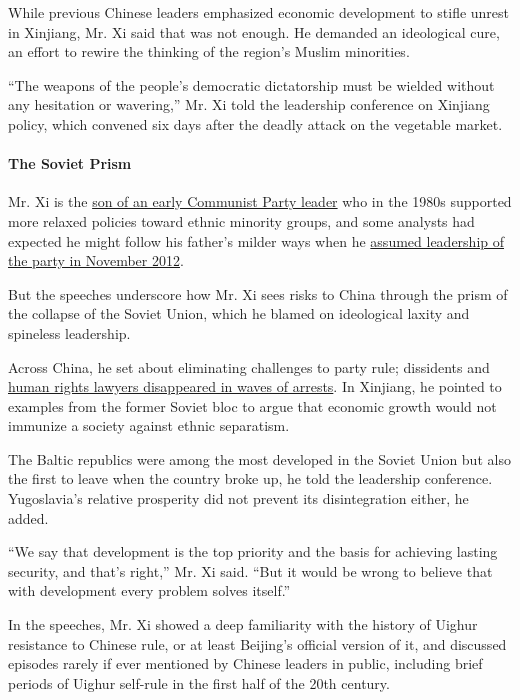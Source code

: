 While previous Chinese leaders emphasized economic development to stifle
unrest in Xinjiang, Mr. Xi said that was not enough. He demanded an
ideological cure, an effort to rewire the thinking of the region's
Muslim minorities.

``The weapons of the people's democratic dictatorship must be wielded
without any hesitation or wavering,'' Mr. Xi told the leadership
conference on Xinjiang policy, which convened six days after the deadly
attack on the vegetable market.

\hypertarget{-the-soviet-prism-}{%
\paragraph{ The Soviet Prism }\label{-the-soviet-prism-}}

Mr. Xi is the
\href{https://sinosphere.blogs.nytimes.com/2013/10/15/china-venerates-a-revolutionary-the-father-of-its-new-leader/}{son
of an early Communist Party leader} who in the 1980s supported more
relaxed policies toward ethnic minority groups, and some analysts had
expected he might follow his father's milder ways when he
\href{https://www.nytimes.com/2012/11/15/world/asia/communists-conclude-party-congress-in-china.html}{assumed
leadership of the party in November 2012}.

But the speeches underscore how Mr. Xi sees risks to China through the
prism of the collapse of the Soviet Union, which he blamed on
ideological laxity and spineless leadership.

Across China, he set about eliminating challenges to party rule;
dissidents and
\href{https://www.nytimes.com/2019/01/28/world/asia/china-wang-quanzhang-human-rights.html}{human
rights lawyers disappeared in waves of arrests}. In Xinjiang, he pointed
to examples from the former Soviet bloc to argue that economic growth
would not immunize a society against ethnic separatism.

The Baltic republics were among the most developed in the Soviet Union
but also the first to leave when the country broke up, he told the
leadership conference. Yugoslavia's relative prosperity did not prevent
its disintegration either, he added.

``We say that development is the top priority and the basis for
achieving lasting security, and that's right,'' Mr. Xi said. ``But it
would be wrong to believe that with development every problem solves
itself.''

In the speeches, Mr. Xi showed a deep familiarity with the history of
Uighur resistance to Chinese rule, or at least Beijing's official
version of it, and discussed episodes rarely if ever mentioned by
Chinese leaders in public, including brief periods of Uighur self-rule
in the first half of the 20th century.

